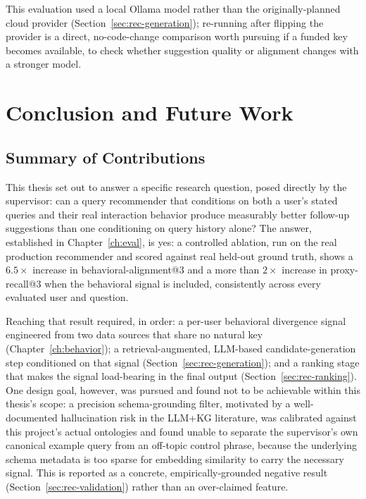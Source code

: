 \documentclass[11pt,a4paper,oneside]{book}
\begin{document}
This evaluation used a local Ollama model rather than the originally-planned cloud provider
(Section~\ref{sec:rec-generation}); re-running after flipping the provider is a direct,
no-code-change comparison worth pursuing if a funded key becomes available, to check whether
suggestion quality or alignment changes with a stronger model.

\chapter{Conclusion and Future Work}
\label{ch:conclusion}

\section{Summary of Contributions}
\label{sec:conclusion-summary}

This thesis set out to answer a specific research question, posed directly by the supervisor: can a
query recommender that conditions on both a user's stated queries and their real interaction
behavior produce measurably better follow-up suggestions than one conditioning on query history
alone? The answer, established in Chapter~\ref{ch:eval}, is yes: a controlled ablation, run on the
real production recommender and scored against real held-out ground truth, shows a $6.5\times$
increase in behavioral-alignment@3 and a more than $2\times$ increase in proxy-recall@3 when the
behavioral signal is included, consistently across every evaluated user and question.

Reaching that result required, in order: a per-user behavioral divergence signal engineered from two
data sources that share no natural key (Chapter~\ref{ch:behavior}); a retrieval-augmented,
LLM-based candidate-generation step conditioned on that signal (Section~\ref{sec:rec-generation});
and a ranking stage that makes the signal load-bearing in the final output
(Section~\ref{sec:rec-ranking}). One design goal, however, was pursued and found not to be
achievable within this thesis's scope: a precision schema-grounding filter, motivated by a
well-documented hallucination risk in the LLM+KG literature, was calibrated against this project's
actual ontologies and found unable to separate the supervisor's own canonical example query from an
off-topic control phrase, because the underlying schema metadata is too sparse for embedding
similarity to carry the necessary signal. This is reported as a concrete, empirically-grounded
negative result (Section~\ref{sec:rec-validation}) rather than an over-claimed feature.
\end{document}
